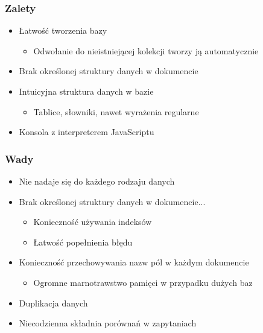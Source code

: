 \documentclass{beamer}
\begin{document}
  \begin{frame}
    \frametitle{Zalety}
    \begin{itemize}
      \item Łatwość tworzenia bazy
      \begin{itemize}
        \item Odwołanie do nieistniejącej kolekcji tworzy ją automatycznie
      \end{itemize}
      \item Brak określonej struktury danych w dokumencie
      \item Intuicyjna struktura danych w bazie
      \begin{itemize}
        \item Tablice, słowniki, nawet wyrażenia regularne
      \end{itemize}
      \item Konsola z interpreterem JavaScriptu
    \end{itemize}
  \end{frame}

  \begin{frame}
    \frametitle{Wady}
    \begin{itemize}
      \item Nie nadaje się do każdego rodzaju danych
      \item Brak określonej struktury danych w dokumencie...
      \begin{itemize}
        \item Konieczność używania indeksów
		\item Łatwość popełnienia błędu
      \end{itemize}
      \item Konieczność przechowywania nazw pól w każdym dokumencie
      \begin{itemize}
        \item Ogromne marnotrawstwo pamięci w przypadku dużych baz
      \end{itemize}
      \item Duplikacja danych
      \item Niecodzienna składnia porównań w zapytaniach
    \end{itemize}
  \end{frame}
\end{document}

